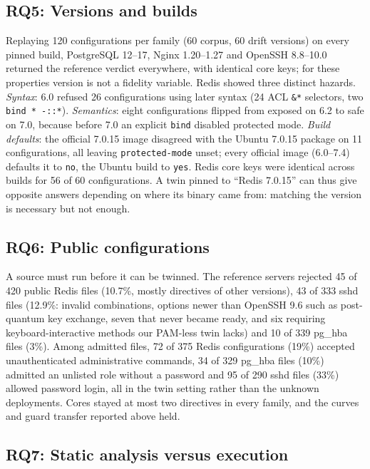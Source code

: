 \documentclass[conference]{IEEEtran}
\newcommand{\RQ}[1]{\textbf{RQ#1}}
\begin{document}
\subsection{\RQ{5}: Versions and builds}
Replaying 120 configurations per family (60 corpus, 60 drift versions) on every pinned build, PostgreSQL 12--17, Nginx 1.20--1.27 and OpenSSH 8.8--10.0 returned the reference verdict everywhere, with identical core keys; for these properties version is not a fidelity variable. Redis showed three distinct hazards. \emph{Syntax}: 6.0 refused 26 configurations using later syntax (24 ACL \texttt{\&*} selectors, two \texttt{bind * -::*}). \emph{Semantics}: eight configurations flipped from exposed on 6.2 to safe on 7.0, because before 7.0 an explicit \texttt{bind} disabled protected mode. \emph{Build defaults}: the official 7.0.15 image disagreed with the Ubuntu 7.0.15 package on 11 configurations, all leaving \texttt{protected-mode} unset; every official image (6.0--7.4) defaults it to \texttt{no}, the Ubuntu build to \texttt{yes}. Redis core keys were identical across builds for 56 of 60 configurations. A twin pinned to ``Redis 7.0.15'' can thus give opposite answers depending on where its binary came from: matching the version is necessary but not enough.

\subsection{\RQ{6}: Public configurations}\label{sec:rw}
A source must run before it can be twinned. The reference servers rejected 45 of 420 public Redis files (10.7\%, mostly directives of other versions), 43 of 333 sshd files (12.9\%: invalid combinations, options newer than OpenSSH 9.6 such as post-quantum key exchange, seven that never became ready, and six requiring keyboard-interactive methods our PAM-less twin lacks) and 10 of 339 pg\_hba files (3\%). Among admitted files, 72 of 375 Redis configurations (19\%) accepted unauthenticated administrative commands, 34 of 329 pg\_hba files (10\%) admitted an unlisted role without a password and 95 of 290 sshd files (33\%) allowed password login, all in the twin setting rather than the unknown deployments. Cores stayed at most two directives in every family, and the curves and guard transfer reported above held.

\subsection{\RQ{7}: Static analysis versus execution}\label{sec:static}
\end{document}
